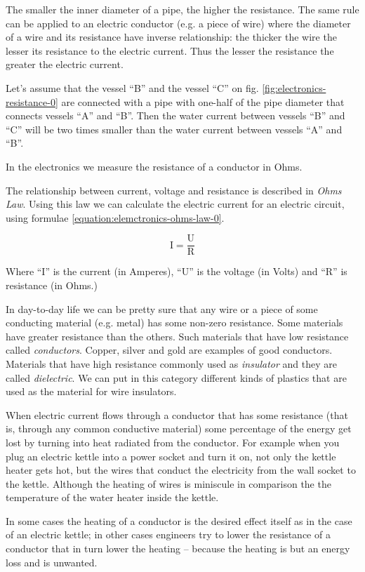 \documentclass[../sparc.tex]{subfiles}
\begin{document}
The smaller the inner diameter of a pipe, the higher the resistance.  The same
rule can be applied to an electric conductor (e.g. a piece of wire) where the
diameter of a wire and its resistance have inverse relationship: the thicker the
wire the lesser its resistance to the electric current.  Thus the lesser the
resistance the greater the electric current.

Let's assume that the vessel ``B'' and the vessel ``C'' on
fig. \ref{fig:electronics-resistance-0} are connected with a pipe with one-half
of the pipe diameter that connects vessels ``A'' and ``B''.  Then the water
current between vessels ``B'' and ``C'' will be two times smaller than the water
current between vessels ``A'' and ``B''.

In the electronics we measure the resistance of a conductor in Ohms.

The relationship between current, voltage and resistance is described in
\emph{Ohms Law}.  Using this law we can calculate the electric current for an
electric circuit, using formulae \ref{equation:elemctronics-ohms-law-0}.

\begin{equation}
  \mbox{I} = \frac{\mbox{U}}{\mbox{R}}
  \label{equation:elemctronics-ohms-law-0}
\end{equation}

Where ``I'' is the current (in Amperes), ``U'' is the voltage (in Volts) and
``R'' is resistance (in Ohms.)

In day-to-day life we can be pretty sure that any wire or a piece of some
conducting material (e.g. metal) has some non-zero resistance.  Some materials
have greater resistance than the others.  Such materials that have low
resistance called \emph{conductors}.  Copper, silver and gold are examples of
good conductors.  Materials that have high resistance commonly used as
\emph{insulator} and they are called \emph{dielectric}.  We can put in this
category different kinds of plastics that are used as the material for wire
insulators.


When electric current flows through a conductor that has some resistance (that
is, through any common conductive material) some percentage of the energy get
lost by turning into heat radiated from the conductor.  For example when you
plug an electric kettle into a power socket and turn it on, not only the kettle
heater gets hot, but the wires that conduct the electricity from the wall socket
to the kettle.  Although the heating of wires is miniscule in comparison the the
temperature of the water heater inside the kettle.

In some cases the heating of a conductor is the desired effect itself as in the
case of an electric kettle; in other cases engineers try to lower the resistance
of a conductor that in turn lower the heating -- because the heating is but an
energy loss and is unwanted.
\end{document}
